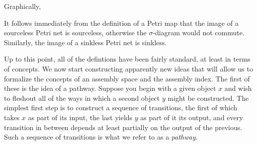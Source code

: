 \documentclass[aps,prd,onecolumn,nofootinbib,letterpaper,preprintnumbers,superscriptaddress,eqsecnum]{revtex4}
\theoremstyle{definition}
\begin{document}
Graphically, 
\begin{center}
\end{center}
It follows immediately from the definition of a Petri map that the image of a sourceless Petri net is sourceless, otherwise the $\sigma$-diagram would not commute.
Similarly, the image of a sinkless Petri net is sinkless.

Up to this point, all of the defintions have been fairly standard, at least in terms of concepts.
We now start constructing apparently new ideas that will allow us to formalize the concepts of an assembly space and the assembly index.
The first of these is the idea of a pathway.
Suppose you begin with a given object $x$ and wish to fleshout all of the ways in which a second object $y$ might be constructed.
The simplest first step is to construct a sequence of transitions, the first of which takes $x$ as part of its input, the last yields $y$ as part of it its output, and every transition in between depends at least partially on the output of the previous.
Such a sequence of transitions is what we refer to as a \textit{pathway}.
\end{document}
